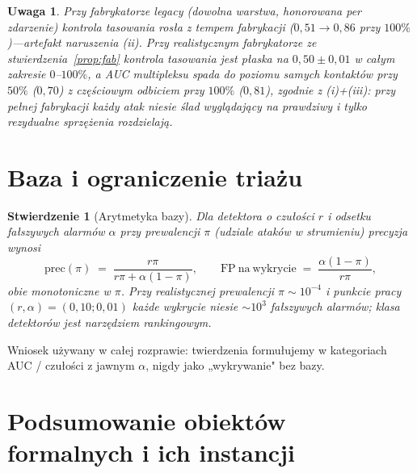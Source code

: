 \documentclass[11pt]{article}
\newtheorem{proposition}[theorem]{Stwierdzenie}
\newtheorem{remark}[theorem]{Uwaga}
\begin{document}
\begin{remark}
Przy fabrykatorze legacy (dowolna warstwa, honorowana per zdarzenie)
kontrola tasowania rosła z tempem fabrykacji ($0{,}51\to0{,}86$ przy
$100\%$)---artefakt naruszenia (ii). Przy realistycznym fabrykatorze ze
stwierdzenia~\ref{prop:fab} kontrola tasowania jest płaska na
$0{,}50\pm0{,}01$ w całym zakresie $0$--$100\%$, a AUC multipleksu spada
do poziomu samych kontaktów przy $50\%$ ($0{,}70$) z częściowym
odbiciem przy $100\%$ ($0{,}81$), zgodnie z (i)+(iii): przy pełnej
fabrykacji każdy atak niesie ślad wyglądający na prawdziwy i tylko
rezydualne sprzężenia rozdzielają.
\end{remark}

\section{Baza i ograniczenie triażu}
\label{sec:baserate}

\begin{proposition}[Arytmetyka bazy]
Dla detektora o czułości $r$ i odsetku fałszywych alarmów $\alpha$ przy
prewalencji $\pi$ (udziale ataków w strumieniu) precyzja wynosi
\[
\mathrm{prec}(\pi) \;=\;
\frac{r\pi}{r\pi+\alpha(1-\pi)},
\qquad
\mathrm{FP\ na\ wykrycie} \;=\; \frac{\alpha(1-\pi)}{r\pi},
\]
obie monotoniczne w $\pi$. Przy realistycznej prewalencji
$\pi\sim10^{-4}$ i punkcie pracy $(r,\alpha)=(0{,}10;0{,}01)$ każde
wykrycie niesie $\sim10^3$ fałszywych alarmów; klasa detektorów jest
narzędziem \emph{rankingowym}.
\end{proposition}

Wniosek używany w całej rozprawie: twierdzenia formułujemy w kategoriach
AUC / czułości z jawnym $\alpha$, nigdy jako „wykrywanie" bez bazy.

\section{Podsumowanie obiektów formalnych i ich instancji}
\label{sec:mapping}
\end{document}
